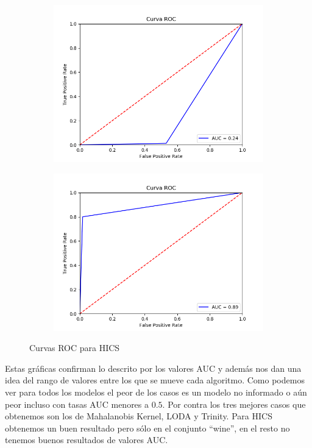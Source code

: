\begin{figure}[H]
	\centering
	\begin{subfigure}{.49\textwidth}
		\centering
		\includegraphics[scale=0.42]{imagenes/imgs-exp1/roc/HICS_breastw}
	\end{subfigure}
	\begin{subfigure}{.49\textwidth}
		\centering
		\includegraphics[scale=0.42]{imagenes/imgs-exp1/roc/HICS_wine}
	\end{subfigure}
	\caption{Curvas ROC para HICS}
	\label{ROC_HICS}
\end{figure}

Estas gráficas confirman lo descrito por los valores AUC y además nos dan una idea del rango de valores entre los que se mueve cada algoritmo. Como podemos ver para todos los modelos el peor de los casos es un modelo no informado o aún peor incluso con tasas AUC menores a $0.5$. Por contra los tres mejores casos que obtenemos son los de Mahalanobis Kernel, LODA y Trinity. Para HICS obtenemos un buen resultado pero sólo en el conjunto ``wine'', en el resto no tenemos buenos resultados de valores AUC.

